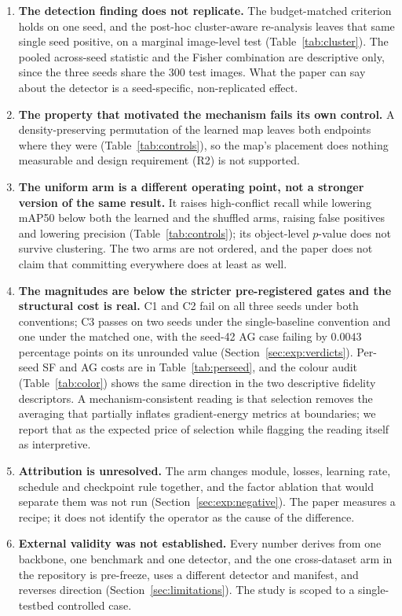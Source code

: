 \documentclass[pdflatex,sn-mathphys-num]{sn-jnl}
\theoremstyle{thmstyleone}%
\theoremstyle{thmstyletwo}%
\theoremstyle{thmstylethree}%
\begin{document}
\begin{enumerate}
\item \textbf{The detection finding does not replicate.} The budget-matched criterion holds on one seed, and the post-hoc cluster-aware re-analysis leaves that same single seed positive, on a marginal image-level test (Table~\ref{tab:cluster}). The pooled across-seed statistic and the Fisher combination are descriptive only, since the three seeds share the 300 test images. What the paper can say about the detector is a seed-specific, non-replicated effect.
\item \textbf{The property that motivated the mechanism fails its own control.} A density-preserving permutation of the learned map leaves both endpoints where they were (Table~\ref{tab:controls}), so the map's placement does nothing measurable and design requirement (R2) is not supported.
\item \textbf{The uniform arm is a different operating point, not a stronger version of the same result.} It raises high-conflict recall while lowering mAP50 below both the learned and the shuffled arms, raising false positives and lowering precision (Table~\ref{tab:controls}); its object-level $p$-value does not survive clustering. The two arms are not ordered, and the paper does not claim that committing everywhere does at least as well.
\item \textbf{The magnitudes are below the stricter pre-registered gates and the structural cost is real.} C1 and C2 fail on all three seeds under both conventions; C3 passes on two seeds under the single-baseline convention and one under the matched one, with the seed-42 AG case failing by $0.0043$ percentage points on its unrounded value (Section~\ref{sec:exp:verdicts}). Per-seed SF and AG costs are in Table~\ref{tab:perseed}, and the colour audit (Table~\ref{tab:color}) shows the same direction in the two descriptive fidelity descriptors. A mechanism-consistent reading is that selection removes the averaging that partially inflates gradient-energy metrics at boundaries; we report that as the expected price of selection while flagging the reading itself as interpretive.
\item \textbf{Attribution is unresolved.} The arm changes module, losses, learning rate, schedule and checkpoint rule together, and the factor ablation that would separate them was not run (Section~\ref{sec:exp:negative}). The paper measures a recipe; it does not identify the operator as the cause of the difference.
\item \textbf{External validity was not established.} Every number derives from one backbone, one benchmark and one detector, and the one cross-dataset arm in the repository is pre-freeze, uses a different detector and manifest, and reverses direction (Section~\ref{sec:limitations}). The study is scoped to a single-testbed controlled case.
\end{enumerate}
\end{document}
